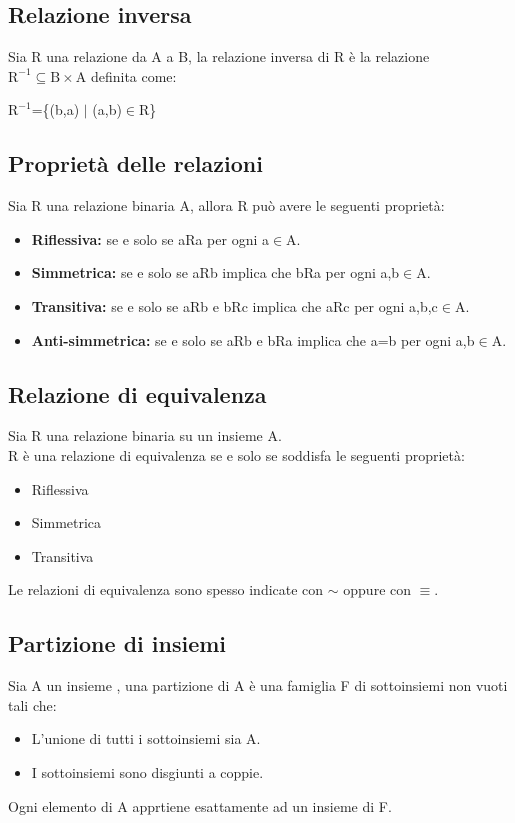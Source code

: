 \documentclass{book}
\begin{document}
    \subsection{Relazione inversa}
    Sia R una relazione da A a B, la relazione inversa di R è la relazione $\text{R}^{-1} \subseteq \text{B} \times \text{A}$ definita come:
    \begin{center}
        $\text{R}^{-1}$=\{(b,a) $|$ (a,b)$\in$R\}
    \end{center}

    \subsection{Proprietà delle relazioni}
    Sia R una relazione binaria A, allora R può avere le seguenti proprietà:
    \begin{itemize}
        \item \textbf{Riflessiva:} se e solo se aRa per ogni a$\in$A.
        \item \textbf{Simmetrica:} se e solo se aRb implica che bRa per ogni a,b$\in$A.
        \item \textbf{Transitiva:} se e solo se aRb e bRc implica che aRc per ogni a,b,c$\in$A.
        \item \textbf{Anti-simmetrica:} se e solo se aRb e bRa implica che a=b per ogni a,b$\in$A.
    \end{itemize}

    \subsection{Relazione di equivalenza}
    Sia R una relazione binaria su un insieme A.\\
    R è una relazione di equivalenza se e solo se soddisfa le seguenti proprietà:
    \begin{itemize}
        \item Riflessiva
        \item Simmetrica
        \item Transitiva
    \end{itemize}
    Le relazioni di equivalenza sono spesso indicate con $\sim$ oppure con $\equiv$.

    \subsection{Partizione di insiemi}
    Sia A un insieme , una partizione di A è una famiglia F di sottoinsiemi non vuoti tali che:
    \begin{itemize}
        \item L'unione di tutti i sottoinsiemi sia A.
        \item I sottoinsiemi sono disgiunti a coppie.
    \end{itemize}
    Ogni elemento di A apprtiene esattamente ad un insieme di F.
\end{document}
